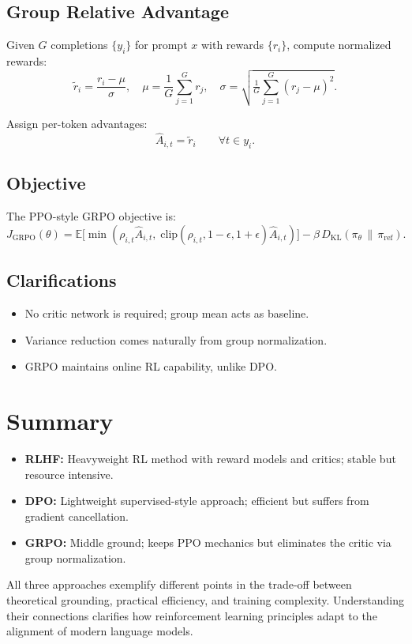 \subsection{Group Relative Advantage}
Given $G$ completions $\{y_i\}$ for prompt $x$ with rewards $\{r_i\}$, compute normalized rewards:
\[
\tilde r_i = \frac{r_i - \mu}{\sigma}, \quad 
\mu = \frac{1}{G}\sum_{j=1}^G r_j, \quad 
\sigma = \sqrt{\tfrac{1}{G}\sum_{j=1}^G (r_j-\mu)^2}.
\]

Assign per-token advantages:
\[
\hat A_{i,t} = \tilde r_i \qquad \forall t \in y_i.
\]

\subsection{Objective}
The PPO-style GRPO objective is:
\[
J_{\text{GRPO}}(\theta) =
\mathbb{E}\Big[\min(\rho_{i,t}\hat A_{i,t},\;\text{clip}(\rho_{i,t},1-\epsilon,1+\epsilon)\hat A_{i,t})\Big]
- \beta\,D_{\mathrm{KL}}(\pi_\theta \,\|\, \pi_{\text{ref}}).
\]

\subsection{Clarifications}
\begin{itemize}
    \item No critic network is required; group mean acts as baseline.
    \item Variance reduction comes naturally from group normalization.
    \item GRPO maintains online RL capability, unlike DPO.
\end{itemize}

\section{Summary}
\begin{itemize}
    \item \textbf{RLHF:} Heavyweight RL method with reward models and critics; stable but resource intensive.
    \item \textbf{DPO:} Lightweight supervised-style approach; efficient but suffers from gradient cancellation.
    \item \textbf{GRPO:} Middle ground; keeps PPO mechanics but eliminates the critic via group normalization.
\end{itemize}

All three approaches exemplify different points in the trade-off between theoretical grounding, practical efficiency, and training complexity. Understanding their connections clarifies how reinforcement learning principles adapt to the alignment of modern language models.
